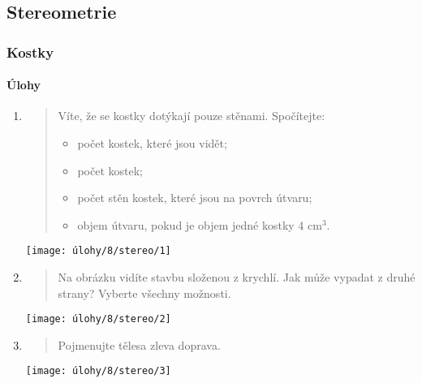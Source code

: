 \newpage

\subsection{Stereometrie}
\label{subsec:stereometrie}

\subsubsection{Kostky}

\paragraph{Úlohy}
\begin{enumerate}
    \item
    \begin{minipage}[t]{\linewidth}
        \begin{quote}
            Víte, že se kostky dotýkají pouze stěnami. Spočítejte:
            \begin{itemize}
                \item počet kostek, které jsou vidět;
                \item počet kostek;
                \item počet stěn kostek, které jsou na povrch útvaru;
                \item objem útvaru, pokud je objem jedné kostky 4 cm$^{3}$.
            \end{itemize}
        \end{quote}
        \centering
        \texttt{[image: úlohy/8/stereo/1]}
    \end{minipage}

    \item
    \begin{minipage}[t]{\linewidth}
        \begin{quote}
            Na obrázku vidíte stavbu složenou z krychlí. Jak může vypadat z druhé strany? Vyberte všechny možnosti.
        \end{quote}
        \centering
        \texttt{[image: úlohy/8/stereo/2]}
    \end{minipage}

    \item
    \begin{minipage}[t]{\linewidth}
        \begin{quote}
            Pojmenujte tělesa zleva doprava.
        \end{quote}
        \centering
        \texttt{[image: úlohy/8/stereo/3]}
    \end{minipage}


\end{enumerate}

